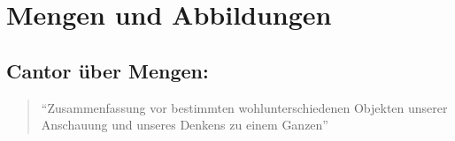 
\newcommand{\fach}{Analysis \RM{1}.}
\newcommand{\semester}{WiSe 2012}
\newcommand{\homepage}{http://wwwmath.uni-muenster.de/u/wilhelm.winter/wwinter/analysis_I.html}
\newcommand{\prof}{Prof.\ Dr.\ Wilhelm Winter}




\maketitle
\begin{abstract}

\section*{Hinweis}
Verglichen mit den neueren Mitschriften ist dieses Skript in einem deutlich schlechteren Zustand, hauptsächlich in technischer Hinsicht, aber auch die inhaltliche 
Fehlersuche war bei weitem nicht so intensiv \ldots damals hatte ich gerade erst angefangen  mich mit \LaTeX{} zu beschäftigen.

Ich plane nicht, daran in näherer Zukunft etwas zu verändern, da dies ziemlich viel Zeit in Anspruch nehmen würde, die 
anderweitig besser investiert ist. Sollte jemand Lust dazu haben, wäre die wichtigste Baustelle das Inhaltsverzeichnis, in dem kurze Beschreibungen der Sätze, Lemmata, etc.
fehlen. Außerdem müssen die Labels eindeutig werden. Wie man dies handhaben kann, sieht man gut in den Dateien der späteren Semester.
\end{abstract}

\tableofcontents
\cleardoubleoddemptypage
{}
\setcounter{page}{1}
\setcounter{footnote}{0}


\setcounter{section}{-1}
\section{Mengen und Abbildungen}

\subsection{Cantor über Mengen:}
\begin{quote} 
\enquote{Zusammenfassung vor bestimmten wohlunterschiedenen Objekten unserer Anschauung und unseres Denkens zu einem Ganzen}
\end{quote}

